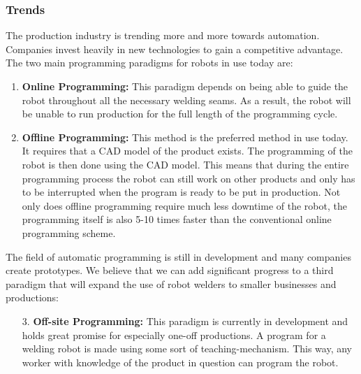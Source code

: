 \subsubsection{Trends}
The production industry is trending more and more towards automation.
Companies invest heavily in new technologies to gain a competitive advantage. 
The two main programming paradigms for robots in use today are:
\begin{enumerate}
\item \textbf{Online Programming:} This paradigm depends on being able to guide the robot throughout all the necessary welding seams. As a result, the robot will be unable to run production for the full length of the programming cycle.
\item \textbf{Offline Programming:} This method is the preferred method in use today. It requires that a CAD model of the product exists. 
The programming of the robot is then done using the CAD model. 
This means that during the entire programming process the robot can still work on other products and only has to be interrupted when the program is ready to be put in production. 
Not only does offline programming require much less downtime of the robot, the programming itself is also 5-10 times faster than the conventional online programming scheme.	
\end{enumerate}
The field of automatic programming is still in development and many companies create prototypes. We believe that we can add significant progress to a third paradigm that will expand the use of robot welders to smaller businesses and productions:
\begin{enumerate}
	\item[3.]{\textbf{Off-site Programming:}} This paradigm is currently in development and holds great promise for especially one-off productions. A program for a welding robot is made using some sort of teaching-mechanism. 
	This way, any worker with knowledge of the product in question can program the robot.
\end{enumerate}
